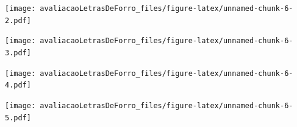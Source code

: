 \documentclass[]{article}
\newenvironment{Shaded}{\begin{snugshade}}{\end{snugshade}}
\newcommand{\DataTypeTok}[1]{\textcolor[rgb]{0.13,0.29,0.53}{#1}}
\newcommand{\DecValTok}[1]{\textcolor[rgb]{0.00,0.00,0.81}{#1}}
\newcommand{\FloatTok}[1]{\textcolor[rgb]{0.00,0.00,0.81}{#1}}
\newcommand{\KeywordTok}[1]{\textcolor[rgb]{0.13,0.29,0.53}{\textbf{#1}}}
\newcommand{\NormalTok}[1]{#1}
\newcommand{\OperatorTok}[1]{\textcolor[rgb]{0.81,0.36,0.00}{\textbf{#1}}}
\newcommand{\StringTok}[1]{\textcolor[rgb]{0.31,0.60,0.02}{#1}}
\begin{document}
\texttt{[image: avaliacaoLetrasDeForro\_files/figure-latex/unnamed-chunk-6-2.pdf]}

\begin{Shaded}
\end{Shaded}

\texttt{[image: avaliacaoLetrasDeForro\_files/figure-latex/unnamed-chunk-6-3.pdf]}

\begin{Shaded}
\end{Shaded}

\texttt{[image: avaliacaoLetrasDeForro\_files/figure-latex/unnamed-chunk-6-4.pdf]}

\begin{Shaded}
\end{Shaded}

\texttt{[image: avaliacaoLetrasDeForro\_files/figure-latex/unnamed-chunk-6-5.pdf]}

\begin{Shaded}
\end{Shaded}
\end{document}
